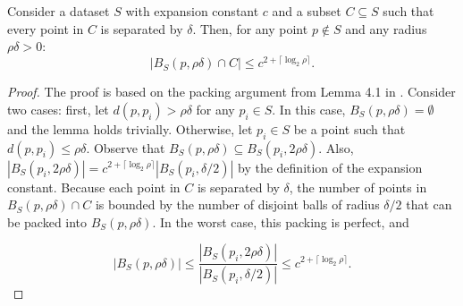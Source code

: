 \begin{lemma}
Consider a dataset $S$ with expansion constant $c$ and a subset $C \subseteq S$
such that every point in $C$ is separated by $\delta$.  Then, for any point
$p \not\in S$ and any radius $\rho \delta > 0$:
\begin{equation}
| B_S(p, \rho \delta) \cap C | \le c^{2 + \lceil \log_2 \rho \rceil}.
\end{equation}
\label{lem:packing}
\end{lemma}

\begin{proof}
The proof is based on the packing argument from Lemma 4.1 in
\cite{langford2006}. Consider two cases: first, let $d(p, p_i) > \rho \delta$
for any $p_i \in S$. In this case, $B_S(p, \rho \delta) = \emptyset$ and the
lemma holds trivially.
Otherwise, let $p_i \in S$ be a point such that $d(p, p_i) \leq \rho \delta$.
Observe that $B_S(p, \rho \delta) \subseteq B_S(p_i, 2 \rho \delta)$.
Also, $| B_S(p_i, 2 \rho \delta) | = c^{2 + \lceil \log_2 \rho
\rceil} | B_S(p_i, \delta / 2) |$ by the definition of the expansion constant.
Because each point in $C$ is separated by $\delta$, the
number of points in $B_S(p, \rho \delta) \cap C$ is
bounded by the number of disjoint balls of radius $\delta / 2$ that can be
packed into $B_S(p, \rho \delta)$.  In the worst case, this packing is
perfect, and

\begin{equation}
|B_S(p, \rho \delta)| \le \frac{|B_S(p_i, 2 \rho \delta)|}{|B_S(p_i, \delta
/ 2)|} \le c^{2 + \lceil \log_2 \rho \rceil}.
\end{equation}
\end{proof}
